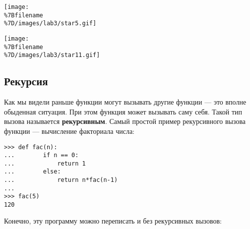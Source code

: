 \texttt{[image: \\\%7Bfilename\\\%7D/images/lab3/star5.gif]}

\texttt{[image: \\\%7Bfilename\\\%7D/images/lab3/star11.gif]}

\begin{Shaded}
\begin{Highlighting}[]
 
 

 
    \OperatorTok{=} \OperatorTok{*}\OperatorTok{*}\OperatorTok{/}
    \OperatorTok{=} \OperatorTok{/}\NormalTok{(}\OperatorTok{*}\NormalTok{(}\OperatorTok{-}\OperatorTok{/}\OperatorTok{**}

    \OperatorTok{/}
    \OperatorTok{/}

      
        \OperatorTok{/}

\NormalTok{, }\NormalTok{)}
\end{Highlighting}
\end{Shaded}

\subsection{Рекурсия}\label{ux440ux435ux43aux443ux440ux441ux438ux44f}

Как мы видели раньше функции могут вызывать другие функции --- это
вполне обыденная ситуация. При этом функция может вызывать саму себя.
Такой тип вызова называется \textbf{рекурсивным}. Самый простой пример
рекурсивного вызова функции --- вычисление факториала числа:

\begin{verbatim}
>>> def fac(n):
...        if n == 0:
...            return 1
...        else:
...            return n*fac(n-1)
...
>>> fac(5)
120
\end{verbatim}

Конечно, эту программу можно переписать и без рекурсивных вызовов:

